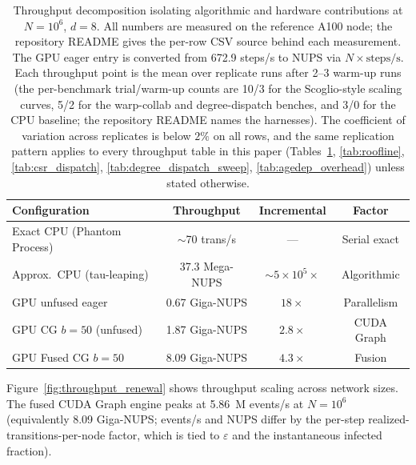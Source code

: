 \documentclass[a4paper,fleqn]{cas-sc}
\theoremstyle{definition}
\theoremstyle{remark}
\begin{document}
\begin{table}[!htbp]
\caption{Throughput decomposition isolating algorithmic and hardware contributions at $N=10^6$, $d=8$. All numbers are measured on the reference A100 node; the repository README gives the per-row CSV source behind each measurement. The GPU eager entry is converted from 672.9 steps/s to NUPS via $N \times \text{steps/s}$. Each throughput point is the mean over replicate runs after 2--3 warm-up runs (the per-benchmark trial/warm-up counts are 10/3 for the Scoglio-style scaling curves, 5/2 for the warp-collab and degree-dispatch benches, and 3/0 for the CPU baseline; the repository README names the harnesses). The coefficient of variation across replicates is below $2\%$ on all rows, and the same replication pattern applies to every throughput table in this paper (Tables~\ref{tab:renewal_layered}, \ref{tab:roofline}, \ref{tab:csr_dispatch}, \ref{tab:degree_dispatch_sweep}, \ref{tab:agedep_overhead}) unless stated otherwise.}
\label{tab:renewal_layered}
\centering
\begin{tabular*}{\tblwidth}{@{}lccc@{}}
\toprule
\textbf{Configuration} & \textbf{Throughput} & \textbf{Incremental} & \textbf{Factor} \\
\midrule
Exact CPU (Phantom Process) & $\sim$70 trans/s        & ---                        & Serial exact \\
Approx.\ CPU (tau-leaping)  & 37.3 Mega-NUPS           & $\sim$$5 \times 10^5\times$ & Algorithmic \\
GPU unfused eager           & 0.67 Giga-NUPS           & $18\times$                  & Parallelism \\
GPU CG $b{=}50$ (unfused)   & 1.87 Giga-NUPS           & $2.8\times$                 & CUDA Graph \\
GPU Fused CG $b{=}50$       & 8.09 Giga-NUPS           & $4.3\times$                 & Fusion \\
\bottomrule
\end{tabular*}
\end{table}

Figure~\ref{fig:throughput_renewal} shows throughput scaling across network sizes. The fused CUDA Graph engine peaks at 5.86~M events/s at $N = 10^6$ (equivalently 8.09 Giga-NUPS; events/s and NUPS differ by the per-step realized-transitions-per-node factor, which is tied to $\varepsilon$ and the instantaneous infected fraction).
\end{document}
